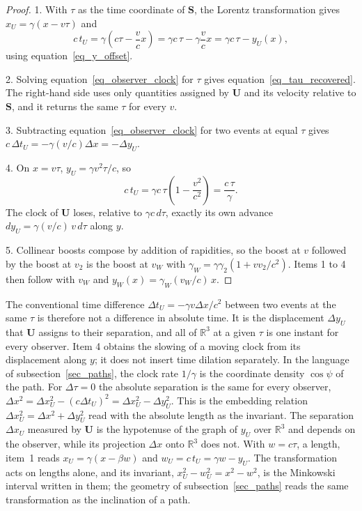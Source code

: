 \documentclass{iopjournal}
\begin{document}
\begin{proof}
1. With $\tau$ as the time coordinate of $\mathbf{S}$, the Lorentz transformation gives $x_U=\gamma(x-v\tau)$ and
\begin{equation}
    c\,t_U=\gamma\left(c\tau-\frac{v}{c}x\right)=\gamma c\,\tau-\gamma\frac{v}{c}x=\gamma c\,\tau-y_U(x),
\end{equation}
using equation~\eqref{eq_y_offset}.

2. Solving equation~\eqref{eq_observer_clock} for $\tau$ gives equation~\eqref{eq_tau_recovered}. The right-hand side uses only quantities assigned by $\mathbf{U}$ and its velocity relative to $\mathbf{S}$, and it returns the same $\tau$ for every $v$.

3. Subtracting equation~\eqref{eq_observer_clock} for two events at equal $\tau$ gives $c\,\Delta t_U=-\gamma(v/c)\Delta x=-\Delta y_U$.

4. On $x=v\tau$, $y_U=\gamma v^2\tau/c$, so
\begin{equation}
    c\,t_U=\gamma c\,\tau\left(1-\frac{v^2}{c^2}\right)=\frac{c\,\tau}{\gamma}.
\end{equation}
The clock of $\mathbf{U}$ loses, relative to $\gamma c\,d\tau$, exactly its own advance $dy_U=\gamma(v/c)\,v\,d\tau$ along $y$.

5. Collinear boosts compose by addition of rapidities, so the boost at $v$ followed by the boost at $v_2$ is the boost at $v_W$ with $\gamma_W=\gamma\gamma_2(1+vv_2/c^2)$. Items 1 to 4 then follow with $v_W$ and $y_W(x)=\gamma_W(v_W/c)\,x$.
\end{proof}

The conventional time difference $\Delta t_U=-\gamma v\Delta x/c^2$ between two events at the same $\tau$ is therefore not a difference in absolute time. It is the displacement $\Delta y_U$ that $\mathbf{U}$ assigns to their separation, and all of $\mathbb{R}^3$ at a given $\tau$ is one instant for every observer. Item 4 obtains the slowing of a moving clock from its displacement along $y$; it does not insert time dilation separately. In the language of subsection~\ref{sec_paths}, the clock rate $1/\gamma$ is the coordinate density $\cos\psi$ of the path. For $\Delta\tau=0$ the absolute separation is the same for every observer, $\Delta x^2=\Delta x_U^2-(c\Delta t_U)^2=\Delta x_U^2-\Delta y_U^2$. This is the embedding relation $\Delta x_U^2=\Delta x^2+\Delta y_U^2$ read with the absolute length as the invariant. The separation $\Delta x_U$ measured by $\mathbf{U}$ is the hypotenuse of the graph of $y_U$ over $\mathbb{R}^3$ and depends on the observer, while its projection $\Delta x$ onto $\mathbb{R}^3$ does not. With $w=c\tau$, a length, item~1 reads $x_U=\gamma\left(x-\beta w\right)$ and $w_U=c\,t_U=\gamma w-y_U$. The transformation acts on lengths alone, and its invariant, $x_U^2-w_U^2=x^2-w^2$, is the Minkowski interval written in them; the geometry of subsection~\ref{sec_paths} reads the same transformation as the inclination of a path.
\end{document}
